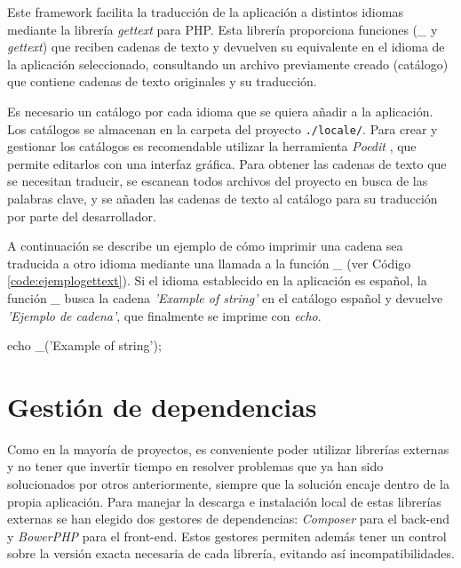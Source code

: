 Este \gls{framework} facilita la traducción de la aplicación a distintos idiomas mediante la librería \textit{gettext} \cite{gettext} para \gls{PHP}. Esta librería proporciona funciones (\textit{\_} y \textit{gettext}) que reciben cadenas de texto y devuelven su equivalente en el idioma de la aplicación seleccionado, consultando un archivo previamente creado (catálogo) que contiene cadenas de texto originales y su traducción.

Es necesario un catálogo por cada idioma que se quiera añadir a la aplicación. Los catálogos se almacenan en la carpeta del proyecto \texttt{./locale/}. Para crear y gestionar los catálogos es recomendable utilizar la herramienta \textit{Poedit} \cite{poedit}, que permite editarlos con una interfaz gráfica. Para obtener las cadenas de texto que se necesitan traducir, se escanean todos archivos del proyecto en busca de las palabras clave, y se añaden las cadenas de texto al catálogo para su traducción por parte del desarrollador.

A continuación se describe un ejemplo de cómo imprimir una cadena sea traducida a otro idioma mediante una llamada a la función \textit{\_} (ver Código \ref{code:ejemplogettext}). Si el idioma establecido en la aplicación es español, la función \textit{\_} busca la cadena \textit{'Example of string'} en el catálogo español y devuelve \textit{'Ejemplo de cadena'}, que finalmente se imprime con \textit{echo}.

\begin{code}[label=code:ejemplogettext,language=php,caption=Ejemplo de traducción con la librería \textit{gettext}]
echo _('Example of string');
\end{code}


\section{Gestión de dependencias\label{extra:mvc:dependencias}}

Como en la mayoría de proyectos, es conveniente poder utilizar librerías externas y no tener que invertir tiempo en resolver problemas que ya han sido solucionados por otros anteriormente, siempre que la solución encaje dentro de la propia aplicación. Para manejar la descarga e instalación local de estas librerías externas se han elegido dos gestores de dependencias: \textit{Composer} \cite{composer} para el \gls{back-end} y \textit{BowerPHP} \cite{bowerphp} para el \gls{front-end}. Estos gestores permiten además tener un control sobre la versión exacta necesaria de cada librería, evitando así incompatibilidades.

